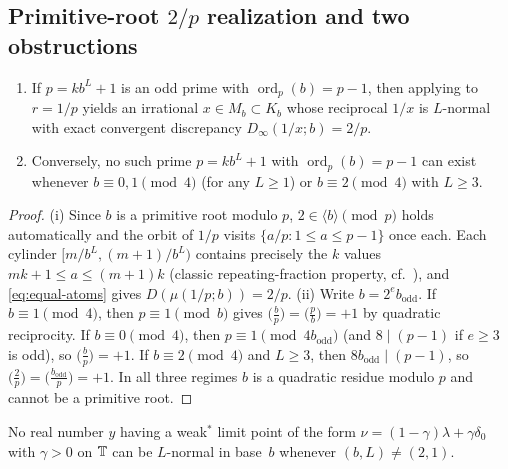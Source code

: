 \documentclass[11pt]{article}
\DeclareMathOperator{\ord}{ord}
\begin{document}
\subsection{Primitive-root $2/p$ realization and two obstructions}

\begin{proposition}\label{prop:primroot-QR}
\begin{enumerate}[label=\textup{(\roman*)},nosep]
\item If $p=kb^L+1$ is an odd prime with $\ord_p(b)=p-1$, then applying  to $r=1/p$ yields an irrational $x\in M_b\subset K_b$ whose reciprocal $1/x$ is $L$-normal with exact convergent discrepancy $D_\infty(1/x;b)=2/p$.
\item Conversely, no such prime $p=kb^L+1$ with $\ord_p(b)=p-1$ can exist whenever $b\equiv0,1\pmod4$ (for any $L\ge1$) or $b\equiv2\pmod4$ with $L\ge3$.
\end{enumerate}
\end{proposition}

\begin{proof}
(i) Since $b$ is a primitive root modulo $p$, $2\in\langle b\rangle\pmod p$ holds automatically and the orbit of $1/p$ visits $\{a/p:1\le a\le p-1\}$ once each. Each cylinder $[m/b^L,(m+1)/b^L)$ contains precisely the $k$ values $mk+1\le a\le (m+1)k$ (classic repeating-fraction property, cf.\ \cite[\S9.12]{HW08}), and \eqref{eq:equal-atoms} gives $D(\mu(1/p;b))=2/p$.
(ii) Write $b=2^eb_{\mathrm{odd}}$. If $b\equiv1\pmod4$, then $p\equiv1\pmod b$ gives $\bigl(\frac bp\bigr)=\bigl(\frac pb\bigr)=+1$ by quadratic reciprocity. If $b\equiv0\pmod4$, then $p\equiv1\pmod{4b_{\mathrm{odd}}}$ (and $8\mid(p-1)$ if $e\ge3$ is odd), so $\bigl(\frac bp\bigr)=+1$. If $b\equiv2\pmod4$ and $L\ge3$, then $8b_{\mathrm{odd}}\mid(p-1)$, so $\bigl(\frac2p\bigr)=\bigl(\frac{b_{\mathrm{odd}}}{p}\bigr)=+1$. In all three regimes $b$ is a quadratic residue modulo $p$ and cannot be a primitive root.
\end{proof}

\begin{proposition}[$R_0=1$ obstruction for $(b,L)\neq(2,1)$]\label{prop:R0-obstruction}
No real number $y$ having a weak$^*$ limit point of the form $\nu=(1-\gamma)\lambda+\gamma\delta_0$ with $\gamma>0$ on $\mathbb T$ can be $L$-normal in base~$b$ whenever $(b,L)\neq(2,1)$.
\end{proposition}
\end{document}
